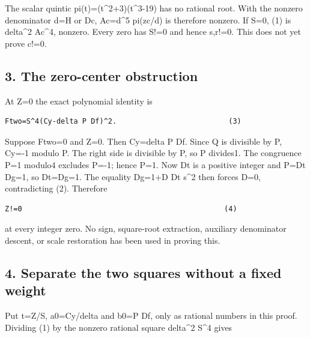 The scalar quintic pi(t)=\allowbreak{}(t\textasciicircum{}\allowbreak{}2+\allowbreak{}3)(t\textasciicircum{}\allowbreak{}3-19) has no rational root. With the nonzero denominator d=\allowbreak{}H or Dc, Ac=\allowbreak{}d\textasciicircum{}\allowbreak{}5 pi(zc/\allowbreak{}d) is therefore nonzero. If S=\allowbreak{}0, (1) is delta\textasciicircum{}\allowbreak{}2 Ac\textasciicircum{}\allowbreak{}4, nonzero. Every zero has S!=\allowbreak{}0 and hence s,r!=\allowbreak{}0. This does not yet prove c!=\allowbreak{}0.



\subsection{3. The zero-center obstruction}



At Z=\allowbreak{}0 the exact polynomial identity is



\begin{verbatim}
Ftwo=S^4(Cy-delta P Df)^2.                          (3)
\end{verbatim}

Suppose Ftwo=\allowbreak{}0 and Z=\allowbreak{}0. Then Cy=\allowbreak{}delta P Df. Since Q is divisible by P, Cy=\allowbreak{}-1 modulo P. The right side is divisible by P, so P divides1. The congruence P=\allowbreak{}1 modulo4 excludes P=\allowbreak{}-1; hence P=\allowbreak{}1. Now Dt is a positive integer and P=\allowbreak{}Dt Dg=\allowbreak{}1, so Dt=\allowbreak{}Dg=\allowbreak{}1. The equality Dg=\allowbreak{}1+\allowbreak{}D Dt s\textasciicircum{}\allowbreak{}2 then forces D=\allowbreak{}0, contradicting (2). Therefore



\begin{verbatim}
Z!=0                                               (4)
\end{verbatim}

at every integer zero. No sign, square-root extraction, auxiliary denominator descent, or scale restoration has been used in proving this.



\subsection{4. Separate the two squares without a fixed weight}



Put t=\allowbreak{}Z/\allowbreak{}S, a0=\allowbreak{}Cy/\allowbreak{}delta and b0=\allowbreak{}P Df, only as rational numbers in this proof. Dividing (1) by the nonzero rational square delta\textasciicircum{}\allowbreak{}2 S\textasciicircum{}\allowbreak{}4 gives



